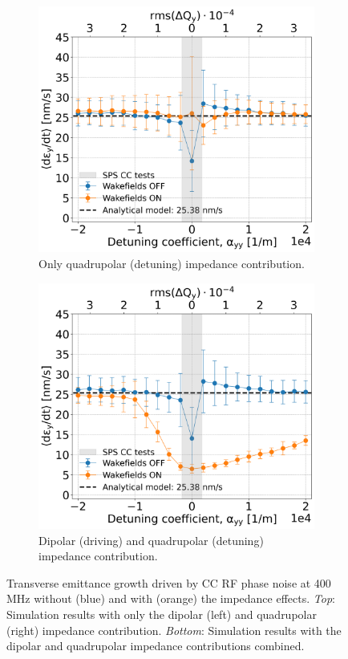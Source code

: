 \begin{figure}[htp]
\begin{subfigure}{.45\textwidth}
        \includegraphics[width=.95\linewidth]{images/Ch7/quadrupolar_impedance.png}
        \caption{Only quadrupolar (detuning) impedance contribution.}
        \label{fig:study_7_quad}
    \end{subfigure}
    \begin{subfigure}{.45\textwidth}
        \centering
        \includegraphics[width=.95\linewidth]{images/Ch7/deyRates_final_2018_PN_sps_270GeV_PN1e-8_400MHz_y-plane_QpxQpy5e-1_6D_Nb5e5_intensity3e10_ayyScan_wakesON_vs_OFF_vs_TuneSpreadvsExpectedSPS.png}  
        \caption{Dipolar (driving) and quadrupolar (detuning) impedance contribution.}
        \label{fig:study_7_dipole_and_quad}
    \end{subfigure}   
    \caption{Transverse emittance growth driven by CC RF phase noise at 400\,MHz without (blue) and with (orange) the impedance effects. \textit{Top}: Simulation results with only the dipolar (left) and quadrupolar (right) impedance contribution. \textit{Bottom}: Simulation results with the dipolar and quadrupolar impedance contributions combined.}
    \label{fig:study_7_dipole_vs_quadrupole}
\end{figure}

